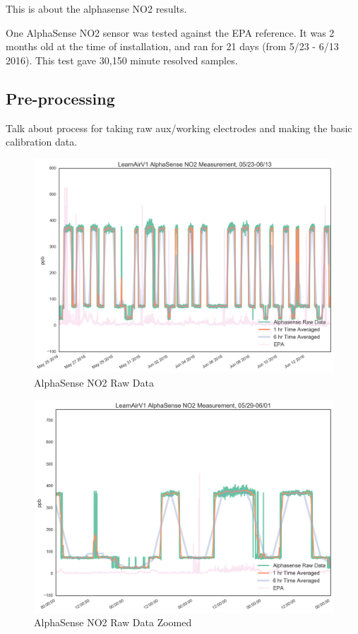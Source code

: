 This is about the alphasense NO2 results.

One AlphaSense NO2 sensor was tested against the EPA reference.  It was 2 months old at the time of installation, and ran for 21 days (from 5/23 - 6/13 2016).  This test gave 30,150 minute resolved samples.


\subsection{Pre-processing}

Talk about process for taking raw aux/working electrodes and making the basic calibration data.


\begin{figure}[htb]
 	\includegraphics[width=\textwidth]{figs/as_no2_raw}               
 	 \caption{AlphaSense NO2 Raw Data}
  	\label{fig:as_no2_raw}
\end{figure}


\begin{figure}[htb]
 	\includegraphics[width=\textwidth]{figs/as_no2_raw_zoomed}               
 	 \caption{AlphaSense NO2 Raw Data Zoomed}
  	\label{fig:as_no2_raw_zoomed}
\end{figure}



